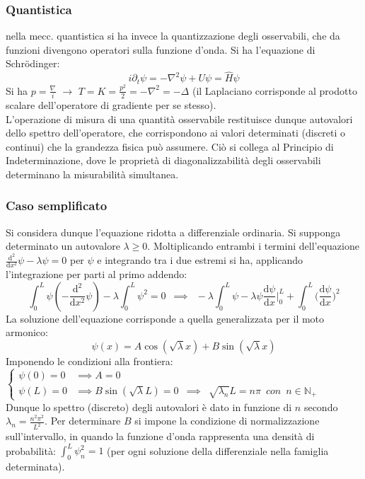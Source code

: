 \documentclass[10pt, oneside]{book}
\theoremstyle{plain}
\begin{document}
\subsubsection{Quantistica} nella mecc. quantistica si ha invece la quantizzazione degli osservabili, che da funzioni divengono operatori sulla funzione d'onda. Si ha l'equazione di Schr\"odinger:
\[i \partial_t \psi = - \nabla^2 \psi + U \psi = \hat{H}\psi\]
Si ha $\displaystyle p = \frac{\nabla}{i}$ $\rightarrow$ $\displaystyle T = K = \frac{p^2}{2} = - \nabla^2 = - \Delta$ (il Laplaciano corrisponde al prodotto scalare dell'operatore di gradiente per se stesso).
\\L'operazione di misura di una quantità osservabile restituisce dunque autovalori dello spettro dell'operatore, che corrispondono ai valori determinati (discreti o continui) che la grandezza fisica può assumere. Ciò si collega al Principio di Indeterminazione, dove le proprietà di diagonalizzabilità degli osservabili determinano la misurabilità simultanea.

\subsubsection{Caso semplificato}
Si considera dunque l'equazione ridotta a differenziale ordinaria. Si supponga determinato un autovalore $\lambda \geq 0$.
Moltiplicando entrambi i termini dell'equazione $\displaystyle \frac{\textrm{d}^2}{\textrm{d}x^2}\psi - \lambda \psi = 0$ per $\psi$ e integrando tra i due estremi si ha, applicando l'integrazione per parti al primo addendo:
\[\int_0^L \psi( - \frac{\textrm{d}^2}{\textrm{d}x^2}\psi) - \lambda \int_0^L \psi^2 = 0 \enspace \implies \enspace - \lambda \int_0^L \psi - \lambda \psi \frac{\textrm{d}\psi}{\textrm{d}x} \bigg|_0^L + \int_0^L \big(\frac{\textrm{d}\psi}{\textrm{d}x}\big)^2\]
La soluzione dell'equazione corrisponde a quella generalizzata per il moto armonico:
\[\psi(x) = A \cos(\sqrt{\lambda}x) + B \sin(\sqrt{\lambda}x)\]
Imponendo le condizioni alla frontiera: $\displaystyle \begin{cases}
    \psi(0) = 0 & \implies A = 0\\
    \psi(L) = 0 & \implies B \sin(\sqrt{\lambda}L) = 0 \enspace \implies \enspace \sqrt{\lambda_n}L = n \pi \enspace con \enspace n \in \mathbb{N}_+
\end{cases}$
\\Dunque lo spettro (discreto) degli autovalori è dato in funzione di $n$ secondo $\displaystyle \lambda_n = \frac{n^2 \pi^2}{L^2}$. Per determinare $B$ si impone la condizione di normalizzazione sull'intervallo, in quando la funzione d'onda rappresenta una densità di probabilità: $\displaystyle \int_0^L \psi_n^2 = 1$ (per ogni soluzione della differenziale nella famiglia determinata).
\end{document}
